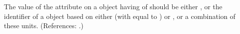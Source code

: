 The value of the attribute  on a \Compartment object having
 of  should be either 
, or the identifier of a \UnitDefinition object based on
either  (with  equal to ) or
, or a combination of these units.  (References: .)
